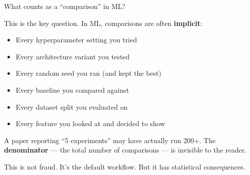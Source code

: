 \documentclass[aspectratio=169,11pt]{beamer}
\begin{document}
\begin{frame}{What counts as a ``comparison'' in ML?}

This is the key question. In ML, comparisons are often \textbf{implicit}:

\vspace{0.5em}

\begin{itemize}\setlength\itemsep{5pt}
  \item {\small Every hyperparameter setting you tried}
  \item {\small Every architecture variant you tested}
  \item {\small Every random seed you ran (and kept the best)}
  \item {\small Every baseline you compared against}
  \item {\small Every dataset split you evaluated on}
  \item {\small Every feature you looked at and decided to show}
\end{itemize}

\vspace{0.5em}

{\small A paper reporting ``5 experiments'' may have actually run 200+. The \textbf{denominator} --- the total number of comparisons --- is invisible to the reader.}

\vspace{0.3em}
{\small This is not fraud. It's the default workflow. But it has statistical consequences.}
\end{frame}

\end{document}
